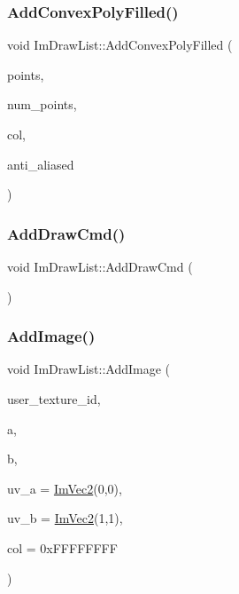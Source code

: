 \hypertarget{struct_im_draw_list_a3ba618d0615e410dce9eaa0b80a30126}{}\label{struct_im_draw_list_a3ba618d0615e410dce9eaa0b80a30126} 
\subsubsection{\texorpdfstring{Add\+Convex\+Poly\+Filled()}{AddConvexPolyFilled()}}
{\footnotesize\ttfamily void Im\+Draw\+List\+::\+Add\+Convex\+Poly\+Filled (\begin{DoxyParamCaption}\item[{const \hyperlink{struct_im_vec2}{Im\+Vec2} $\ast$}]{points,  }\item[{const int}]{num\+\_\+points,  }\item[{Im\+U32}]{col,  }\item[{bool}]{anti\+\_\+aliased }\end{DoxyParamCaption})}

\hypertarget{struct_im_draw_list_a846714bb0321c6f1f908767abc8559e6}{}\label{struct_im_draw_list_a846714bb0321c6f1f908767abc8559e6} 
\subsubsection{\texorpdfstring{Add\+Draw\+Cmd()}{AddDrawCmd()}}
{\footnotesize\ttfamily void Im\+Draw\+List\+::\+Add\+Draw\+Cmd (\begin{DoxyParamCaption}{ }\end{DoxyParamCaption})}

\hypertarget{struct_im_draw_list_ac37cd998bf5f40705c7445004a029b66}{}\label{struct_im_draw_list_ac37cd998bf5f40705c7445004a029b66} 
\subsubsection{\texorpdfstring{Add\+Image()}{AddImage()}}
{\footnotesize\ttfamily void Im\+Draw\+List\+::\+Add\+Image (\begin{DoxyParamCaption}\item[{Im\+Texture\+ID}]{user\+\_\+texture\+\_\+id,  }\item[{const \hyperlink{struct_im_vec2}{Im\+Vec2} \&}]{a,  }\item[{const \hyperlink{struct_im_vec2}{Im\+Vec2} \&}]{b,  }\item[{const \hyperlink{struct_im_vec2}{Im\+Vec2} \&}]{uv\+\_\+a = {\ttfamily \hyperlink{struct_im_vec2}{Im\+Vec2}(0,0)},  }\item[{const \hyperlink{struct_im_vec2}{Im\+Vec2} \&}]{uv\+\_\+b = {\ttfamily \hyperlink{struct_im_vec2}{Im\+Vec2}(1,1)},  }\item[{Im\+U32}]{col = {\ttfamily 0xFFFFFFFF} }\end{DoxyParamCaption})}

